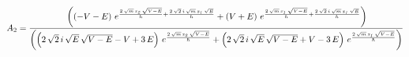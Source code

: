 $$
  A_2 =
  \frac
  {
     {\,
     \left(\left(-V-E\right)\,e^{{{2\,\sqrt{m}\,{\it x_2}\,\sqrt{V-E}
     }\over{{\it \hbar}}}+{{2\,\sqrt{2}\,i\,\sqrt{m}\,{\it x_1}\,\sqrt{E}
     }\over{{\it \hbar}}}}+\left(V+E\right)\,e^{{{2\,\sqrt{m}\,{\it x_1}\,
     \sqrt{V-E}}\over{{\it \hbar}}}+{{2\,\sqrt{2}\,i\,\sqrt{m}\,{\it x_1}
     \,\sqrt{E}}\over{{\it \hbar}}}}\right)}
  }
  {
     \left({\left(2\,\sqrt{2}\,i\,
     \sqrt{E}\,\sqrt{V-E}-V+3\,E\right)\,e^{{{2\,\sqrt{m}\,{\it x_2}\,
     \sqrt{V-E}}\over{{\it \hbar}}}}+\left(2\,\sqrt{2}\,i\,\sqrt{E}\,
     \sqrt{V-E}+V-3\,E\right)\,e^{{{2\,\sqrt{m}\,{\it x_1}\,\sqrt{V-E}
     }\over{{\it \hbar}}}}}\right)
   }
$$
